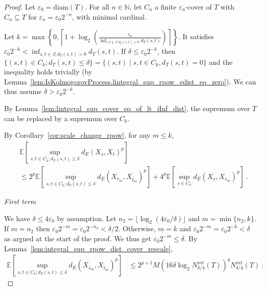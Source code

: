 \begin{proof}
Let $\varepsilon_0 = \mathrm{diam}(T)$.
For all $n \in \mathbb{N}$, let $C_n$ a finite $\varepsilon_n$-cover of $T$ with $C_n \subseteq T$ for $\varepsilon_n = \varepsilon_0 2^{-n}$, with minimal cardinal.

Let $k = \max \left\{ 0, \left\lceil 1 + \log_2\left(\frac{\varepsilon_0}{\inf_{s, t \in J; d_T(s,t)>0}d_T(s, t)}\right) \right\rceil \right\}$.
It satisfies $\varepsilon_0 2^{-k} < \inf_{s, t \in J; d_T(s,t)>0}d_T(s, t)$.
If $\delta \le \varepsilon_0 2^{-k}$, then $\{(s, t) \in C_k; d_T(s, t) \le \delta\} = \{(s, t) \mid s,t \in C_k, d_T(s,t) = 0\}$ and the inequality holds trivially (by Lemma~\ref{lem:IsKolmogorovProcess.lintegral_sup_rpow_edist_eq_zero}).
We can thus assume $\delta > \varepsilon_0 2^{-k}$.

By Lemma~\ref{lem:lintegral_sup_cover_eq_of_lt_iInf_dist}, the supremum over $T$ can be replaced by a supremum over $C_k$.

By Corollary~\ref{cor:scale_change_rpow}, for any $m \le k$,
\begin{align*}
  &\mathbb{E}\left[ \sup_{s, t \in C_k; d_T(s, t) \le \delta} d_E(X_s, X_t)^p \right]
  \\
  &\le 2^p \mathbb{E}\left[ \sup_{s, t \in C_k; d_T(s, t) \le \delta} d_E(X_{\bar{s}_m}, X_{\bar{t}_m})^p \right]
    + 4^p \mathbb{E}\left[ \sup_{s \in C_k} d_E(X_s, X_{\bar{s}_m})^p \right]
  \: .
\end{align*}

\emph{First term}

We have $\delta \le 4\varepsilon_0$ by assumption.
Let $n_2 = \lfloor \log_2(4\varepsilon_0/\delta) \rfloor$ and $m = \min\{n_2, k\}$.
If $m = n_2$ then $\varepsilon_0 2^{-m} = \varepsilon_0 2^{-n_2} < \delta/2$.
Otherwise, $m = k$ and $\varepsilon_0 2^{-m} = \varepsilon_0 2^{-k} < \delta$ as argued at the start of the proof.
We thus get $\varepsilon_0 2^{-m} \le \delta$.
By Lemma~\ref{lem:integral_sup_rpow_dist_cover_rescale},
\begin{align*}
  \mathbb{E} \left[ \sup_{s, t \in C_k; d_T(s, t) \le \delta} d_E(X_{\bar{s}_m}, X_{\bar{t}_m})^p \right]
  &\le 2^{p+1} M \left(16 \delta \log_2 N^{int}_{\delta/4}(T) \right)^q  N^{int}_{\delta/4}(T)
  \: .
\end{align*}


\end{proof}
